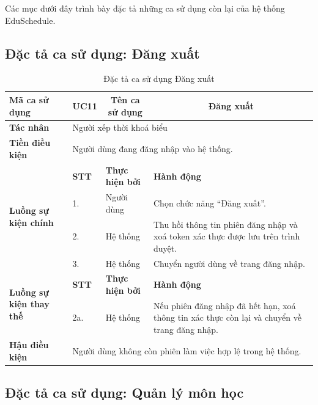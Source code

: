 \documentclass[../DoAn.tex]{subfiles}
\begin{document}
Các mục dưới đây trình bày đặc tả những ca sử dụng còn lại của hệ thống
EduSchedule.

\subsection{Đặc tả ca sử dụng: Đăng xuất}

\begin{longtable}{|p{2.8cm}|p{1cm}|p{2.8cm}|p{6.3cm}|}
\caption{Đặc tả ca sử dụng Đăng xuất}
\label{tab:app_uc_dang_xuat} \\
\hline
\multicolumn{1}{|l|}{\textbf{Mã ca sử dụng}} & \multicolumn{1}{c|}{UC11} &
\multicolumn{1}{c|}{\textbf{Tên ca sử dụng}} & \multicolumn{1}{c|}{Đăng xuất} \\
\hline
\multicolumn{1}{|l|}{\textbf{Tác nhân}} & \multicolumn{3}{l|}{Người xếp thời khoá biểu} \\
\hline
\multicolumn{1}{|l|}{\textbf{Tiền điều kiện}} & \multicolumn{3}{l|}{Người dùng đang đăng nhập vào hệ thống.} \\
\hline
\multirow{4}{2.8cm}{\textbf{Luồng sự kiện chính}} & \textbf{STT} & \textbf{Thực hiện bởi} & \textbf{Hành động} \\
\cline{2-4}
& 1. & Người dùng & Chọn chức năng ``Đăng xuất''. \\
\cline{2-4}
& 2. & Hệ thống & Thu hồi thông tin phiên đăng nhập và xoá token xác thực được lưu trên trình duyệt. \\
\cline{2-4}
& 3. & Hệ thống & Chuyển người dùng về trang đăng nhập. \\
\hline
\multirow{2}{2.8cm}{\textbf{Luồng sự kiện thay thế}} & \textbf{STT} & \textbf{Thực hiện bởi} & \textbf{Hành động} \\
\cline{2-4}
& 2a. & Hệ thống & Nếu phiên đăng nhập đã hết hạn, xoá thông tin xác thực còn lại và chuyển về trang đăng nhập. \\
\hline
\multicolumn{1}{|l|}{\textbf{Hậu điều kiện}} & \multicolumn{3}{l|}{Người dùng không còn phiên làm việc hợp lệ trong hệ thống.} \\
\hline
\end{longtable}

\subsection{Đặc tả ca sử dụng: Quản lý môn học}
\end{document}
